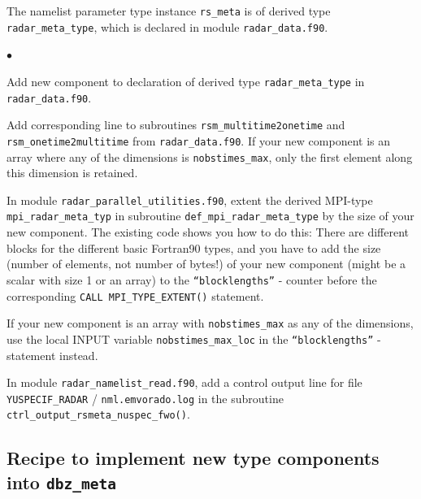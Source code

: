\documentclass[10pt,a4paper,twoside,headinclude,footinclude,parskip=half]{scrartcl}
\newcommand{\myaktuellesection}{sec:intro}%
\newcommand{\labelsec}[1]{\label{#1}\renewcommand{\myaktuellesection}{#1}}%
\newcommand{\labelsec}[1]{\label{#1}}%
\newlength{\tmplena}%
\newenvironment{aufzaehlung}%
{\begin{list}{$\bullet$}{%
      \setlength{\labelwidth}{8mm}%
      \setlength{\leftmargin}{\labelwidth*\real{0.5}}%
      \setlength{\tmplena}{\itemsep}%
      \setlength{\itemsep}{0mm}%
}}{\setlength{\itemsep}{\tmplena}\end{list}}%
\newcommand{\srcform}[1]{\mbox{\texttt{#1}}\xspace}%
\begin{document}
The namelist parameter type instance \srcform{rs_meta} is of derived type \srcform{radar_meta_type}, which
is declared in module \srcform{radar_data.f90}.
\begin{aufzaehlung}
\item Add new component to declaration of derived type \srcform{radar_meta_type} in \srcform{radar_data.f90}.
\item Add corresponding line to subroutines \srcform{rsm_multitime2onetime} and \srcform{rsm_onetime2multitime} from \srcform{radar_data.f90}.
If your new component is an array where any of the dimensions is \srcform{nobstimes_max}, only the first element 
along this dimension is retained.
\item In module \srcform{radar_parallel_utilities.f90}, extent the derived MPI-type \srcform{mpi_radar_meta_typ}
in subroutine \srcform{def_mpi_radar_meta_type} by the size of your new component.
The existing code shows you how to do this: There are different blocks for the different
basic Fortran90 types, and you have to add the size (number of elements, not number of bytes!) of
your new component (might be a scalar with size 1 or an array) to the
\srcform{``blocklengths''} - counter before the corresponding \srcform{CALL MPI_TYPE_EXTENT()} statement.
\item If your new component is an array with \srcform{nobstimes_max} as any of the dimensions, use the local INPUT variable
\srcform{nobstimes_max_loc} in the \srcform{``blocklengths''} - statement instead.
\item In module \srcform{radar_namelist_read.f90}, add a control output line for file \srcform{YUSPECIF_RADAR} / \srcform{nml.emvorado.log} in the
subroutine \srcform{ctrl_output_rsmeta_nuspec_fwo()}.
\end{aufzaehlung}

\subsection{Recipe to implement new type components into \srcform{dbz_meta}}

\labelsec{sec:devel:newtypedbz}
\end{document}
